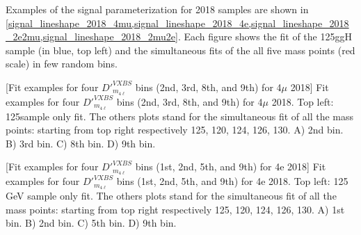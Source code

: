 Examples of the signal parameterization for 2018 samples are shown in \cref{signal_lineshape_2018_4mu,signal_lineshape_2018_4e,signal_lineshape_2018_2e2mu,signal_lineshape_2018_2mu2e}. 
Each figure shows the fit of the 125\GeV ggH sample (in blue, top left) and the simultaneous fits of the all five mass points (red scale) in few random bins.
\begin{multiFigure}
    \centering
        [Fit examples for four $D'^{VXBS}_{m_{4\ell}}$ bins (2nd, 3rd, 8th, and 9th) for 4$\mu$ 2018]
        {Fit examples for four $D'^{VXBS}_{m_{4\ell}}$ bins (2nd, 3rd, 8th, and 9th) for 4$\mu$ 2018.
        Top left: 125\GeV sample only fit. The others plots stand for the simultaneous fit of all the mass points:
        starting from top right respectively 125, 120, 124, 126, 130\GeV.
        \;A) 2nd bin.
        \;B) 3rd bin.
        \;C) 8th bin.
        \;D) 9th bin.}
\label{signal_lineshape_2018_4mu}
\end{multiFigure}
\begin{multiFigure}
    \centering
        [Fit examples for four $D'^{VXBS}_{m_{4\ell}}$ bins (1st, 2nd, 5th, and 9th) for 4e 2018]
        {Fit examples for four $D'^{VXBS}_{m_{4\ell}}$ bins (1st, 2nd, 5th, and 9th) 
        for 4e 2018. Top left: 125 GeV sample only fit. The others plots stand for the simultaneous 
        fit of all the mass points: starting from top right respectively 125, 120, 124, 126, 130\GeV.
        \;A) 1st bin.
        \;B) 2nd bin.
        \;C) 5th bin.
        \;D) 9th bin.} %
    \label{signal_lineshape_2018_4e}
\end{multiFigure}
